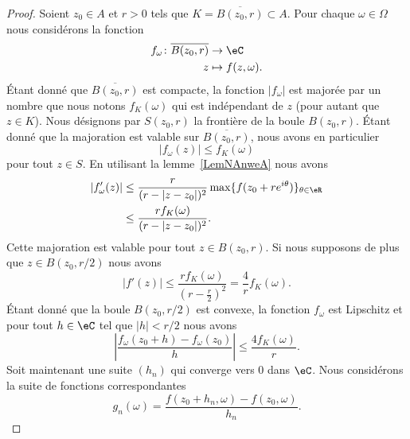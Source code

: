 \begin{proof}
	Soient \( z_0\in A\) et \( r>0\) tels que \( K=\overline{ B(z_0,r) }\subset A\). Pour chaque \( \omega\in \Omega\) nous considérons la fonction
	\begin{equation}
		\begin{aligned}
			f_{\omega}\colon \overline{ B(z_0,r) } & \to \eC              \\
			z                                      & \mapsto f(z,\omega).
		\end{aligned}
	\end{equation}
	Étant donné que \( \overline{ B(z_0,r) }\) est compacte, la fonction \( | f_{\omega} |\) est majorée par un nombre que nous notons \( f_K(\omega)\) qui est indépendant de \( z\) (pour autant que \( z\in K\)). Nous désignons par \( S(z_0,r)\) la frontière de la boule \( B(z_0,r)\). Étant donné que la majoration est valable sur \( \overline{ B(z_0,r) }\), nous avons en particulier
	\begin{equation}
		| f_{\omega}(z) |\leq f_K(\omega)
	\end{equation}
	pour tout \( z\in S\). En utilisant la lemme~\ref{LemNAnweA} nous avons
	\begin{subequations}
		\begin{align}
			| f'_{\omega}(z) | & \leq \frac{ r }{ (r-| z-z_0 |)^2 }\max\{ f(z_0+r e^{i\theta}) \}_{\theta\in \eR} \\
			                   & \leq \frac{ rf_K(\omega) }{ (r-| z-z_0 |)^2 }.
		\end{align}
	\end{subequations}
	Cette majoration est valable pour tout \( z\in B(z_0,r)\). Si nous supposons de plus que \( z\in B(z_0,r/2)\)  nous avons
	\begin{equation}
		| f'(z) |\leq \frac{ rf_K(\omega) }{ \left( r-\frac{ r }{2} \right)^2 }=\frac{ 4 }{ r }f_K(\omega).
	\end{equation}
	Étant donné que la boule \( B(z_0,r/2)\) est convexe, la fonction \( f_{\omega}\) est Lipschitz et pour tout \( h\in \eC\) tel que \( | h |<r/2\) nous avons
	\begin{equation}
		\left| \frac{ f_{\omega}(z_0+h)-f_{\omega}(z_0) }{ h } \right| \leq \frac{ 4f_K(\omega) }{ r }.
	\end{equation}
	Soit maintenant une suite \( (h_n)\) qui converge vers \( 0\) dans \( \eC\). Nous considérons la suite de fonctions correspondantes
	\begin{equation}
		g_n(\omega)=\frac{ f(z_0+h_n,\omega)-f(z_0,\omega) }{ h_n }.

\end{equation}
\end{proof}
